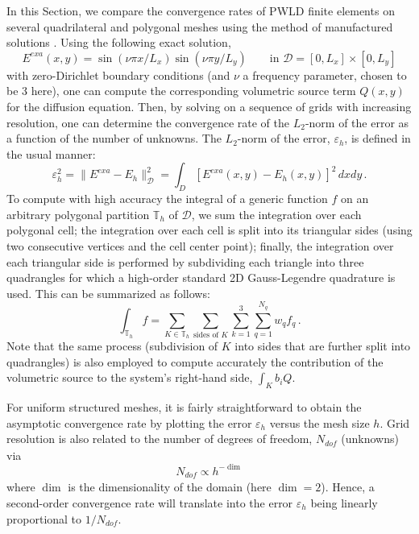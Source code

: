 \documentclass[preprint,10pt]{elsarticle}
\newcommand{\D}{\mathcal{D}}
\newcommand{\tf}{b}
\begin{document}
In this Section, we compare the convergence rates of PWLD finite elements on several quadrilateral
and polygonal meshes using the method of manufactured solutions \cite{roache_2009}. Using the following exact solution,
\begin{equation}
	E^{\textit{exa}}(x,y) = \sin(\nu \pi x/L_x) \sin(\nu\pi y/L_y) \qquad \text{in } \D=[0,L_x]\times [0,L_y]
\end{equation}
with zero-Dirichlet boundary conditions (and $\nu$ a frequency parameter, chosen to be 3 here), one can compute 
the corresponding volumetric source term $Q(x,y)$ for the diffusion equation. Then, by solving on a sequence of
grids with increasing resolution, one can determine the convergence rate of the $L_2$-norm of the error
as a function of the number of unknowns. The $L_2$-norm of the error, $\varepsilon_h$, is defined in the usual manner:
\begin{equation}
	\varepsilon_h^2 = \| E^{\textit{exa}} - E_h \|^2_\D = \int_D \left[ E^{\textit{exa}}(x,y)  - E_h(x,y) \right]^2 \, dxdy	\, .
\end{equation}
To compute with high accuracy the integral of a generic function $f$ on an arbitrary polygonal partition $\mathbb{T}_h$ of $\D$, we sum the integration over each polygonal cell; the integration over each cell is split into its triangular sides (using two consecutive vertices and the cell center point); finally, the integration over each triangular side is performed by subdividing each triangle into three quadrangles for which a high-order standard 2D Gauss-Legendre quadrature is used. This can be summarized as follows:
\begin{equation}
	\int_{\mathbb{T}_h} f  = \sum_{K\in \mathbb{T}_h} \sum_{\text{sides of }K} \sum_{k=1}^3 
	\sum_{q=1}^{N_q} w_q f_q
	\, .
\end{equation}
Note that the same process (subdivision of $K$ into sides that are further split into quadrangles) is also employed to compute accurately the contribution of the volumetric source to the system's right-hand side, $\int_K \tf_i Q$.

For uniform structured meshes, it is fairly straightforward to obtain the asymptotic convergence rate by plotting the error $\varepsilon_h$ versus the mesh size $h$. Grid resolution is also related to the number of degrees of freedom, $N_\textit{dof}$ (unknowns) via 
\begin{equation}
N_{\textit{dof}} \propto  h ^{-\dim} 
\end{equation}
where $\dim$ is the dimensionality of the domain (here $\dim = 2$). Hence, a second-order convergence rate will translate into the error $\varepsilon_h$ being linearly proportional to $1/N_{\textit{dof}}$.
\end{document}
